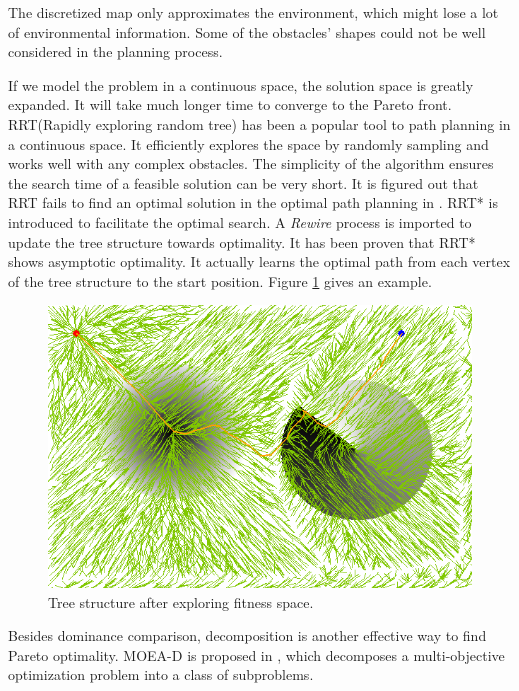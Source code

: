 \documentclass[conference]{IEEEtran}
\theoremstyle{definition}
\begin{document}
The discretized map only approximates the environment, which might lose a lot of environmental information.
Some of the obstacles' shapes could not be well considered in the planning process.

If we model the problem in a continuous space, the solution space is greatly expanded. 
It will take much longer time to converge to the Pareto front.
RRT(Rapidly exploring random tree) has been a popular tool to path planning in a continuous space.
It efficiently explores the space by randomly sampling and works well with any complex obstacles.
The simplicity of the algorithm ensures the search time of a feasible solution can be very short.
It is figured out that RRT fails to find an optimal solution in the optimal path planning in \cite{Karaman.Frazzoli:RSS10}.
RRT* is introduced to facilitate the optimal search.
A \emph{Rewire} process is imported to update the tree structure towards optimality.
It has been proven that RRT* shows asymptotic optimality.
It actually learns the optimal path from each vertex of the tree structure to the start position.
Figure \ref{fig:RRTstar2} gives an example.
\begin{figure}
\centering
\includegraphics[width=0.7\linewidth]{fig/RRTstar2}
\caption{Tree structure after exploring fitness space.}
\label{fig:RRTstar2}
\end{figure}

Besides dominance comparison, decomposition is another effective way to find Pareto optimality.
MOEA-D is proposed in \cite{4358754}, which decomposes a multi-objective optimization problem into a class of subproblems.
\end{document}
